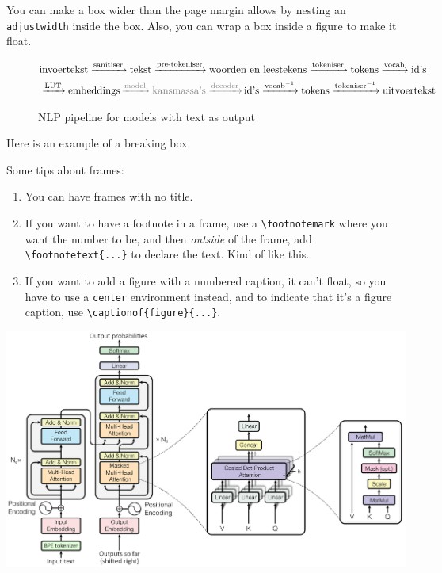 You can make a box wider than the page margin allows by nesting an \verb|adjustwidth| inside the box. Also, you can wrap a box inside a figure to make it float.
\begin{figure}[h]
	\begin{mdframed}[backgroundcolor=black!5, innertopmargin=-0.6em]
	\begin{adjustwidth}{0cm}{-1cm}
			\begin{equation*}\begin{aligned}
			&\text{invoertekst} \xrightarrow{\text{sanitiser}} \text{tekst} \xrightarrow{\text{pre-tokeniser}} \text{woorden en leestekens} \xrightarrow{\text{tokeniser}} \text{tokens} \xrightarrow{\text{vocab}} \text{id's} \\ &\xrightarrow{\text{LUT}} \text{embeddings} {\color{gray} \,\xrightarrow{\text{model}} \text{kansmassa's} \xrightarrow{\text{decoder}}\, } \text{id's} \xrightarrow{\text{vocab}^{-1}} \text{tokens} \xrightarrow{\text{tokeniser}^{-1}} \text{uitvoertekst}
		\end{aligned}\end{equation*}
	\end{adjustwidth}
	\end{mdframed}
	\caption{NLP pipeline for models with text as output}
	\label{fig:pipeline}
\end{figure}

Here is an example of a breaking box.
\begin{mdframed}[backgroundcolor=black!5]
Some tips about frames:
\begin{enumerate}
	\item You can have frames with no title.
	\item If you want to have a footnote in a frame, use a \verb|\footnotemark| where you want the number to be, and then \emph{outside} of the frame, add \verb|\footnotetext{...}| to declare the text. Kind of like this.\footnotemark 	
	\item If you want to add a figure with a numbered caption, it can't float, so you have to use a \verb|center| environment instead, and to indicate that it's a figure caption, use \verb|\captionof{figure}{...}|.
\end{enumerate}

\begin{center}
	\includegraphics[width=0.75\linewidth]{res/fig/vaswani-transformer}
\end{center}

\end{mdframed}

